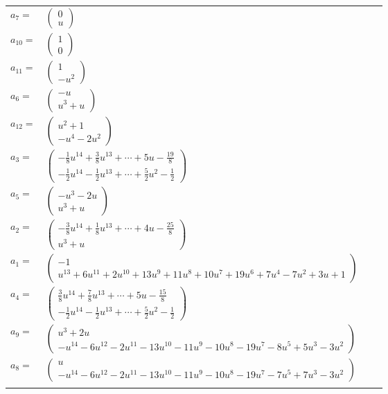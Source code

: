 \documentclass[1p]{elsarticle_modified}
\theoremstyle{definition}
\begin{document}
\begin{tabular}{m{7pt} m{180pt} m{7pt} m{180pt} }
\flushright $a_{7}=$&$\begin{pmatrix}0\\u\end{pmatrix}$ \\
\flushright $a_{10}=$&$\begin{pmatrix}1\\0\end{pmatrix}$ \\
\flushright $a_{11}=$&$\begin{pmatrix}1\\- u^2\end{pmatrix}$ \\
\flushright $a_{6}=$&$\begin{pmatrix}- u\\u^3+u\end{pmatrix}$ \\
\flushright $a_{12}=$&$\begin{pmatrix}u^2+1\\- u^4-2 u^2\end{pmatrix}$ \\
\flushright $a_{3}=$&$\begin{pmatrix}-\frac{1}{8} u^{14}+\frac{3}{8} u^{13}+\cdots+5 u-\frac{19}{8}\\-\frac{1}{2} u^{14}-\frac{1}{2} u^{13}+\cdots+\frac{5}{2} u^2-\frac{1}{2}\end{pmatrix}$ \\
\flushright $a_{5}=$&$\begin{pmatrix}- u^3-2 u\\u^3+u\end{pmatrix}$ \\
\flushright $a_{2}=$&$\begin{pmatrix}-\frac{3}{8} u^{14}+\frac{1}{8} u^{13}+\cdots+4 u-\frac{25}{8}\\u^3+u\end{pmatrix}$ \\
\flushright $a_{1}=$&$\begin{pmatrix}-1\\u^{13}+6 u^{11}+2 u^{10}+13 u^9+11 u^8+10 u^7+19 u^6+7 u^4-7 u^2+3 u+1\end{pmatrix}$ \\
\flushright $a_{4}=$&$\begin{pmatrix}\frac{3}{8} u^{14}+\frac{7}{8} u^{13}+\cdots+5 u-\frac{15}{8}\\-\frac{1}{2} u^{14}-\frac{1}{2} u^{13}+\cdots+\frac{5}{2} u^2-\frac{1}{2}\end{pmatrix}$ \\
\flushright $a_{9}=$&$\begin{pmatrix}u^3+2 u\\- u^{14}-6 u^{12}-2 u^{11}-13 u^{10}-11 u^9-10 u^8-19 u^7-8 u^5+5 u^3-3 u^2\end{pmatrix}$ \\
\flushright $a_{8}=$&$\begin{pmatrix}u\\- u^{14}-6 u^{12}-2 u^{11}-13 u^{10}-11 u^9-10 u^8-19 u^7-7 u^5+7 u^3-3 u^2\end{pmatrix}$\\&\end{tabular}
\end{document}
